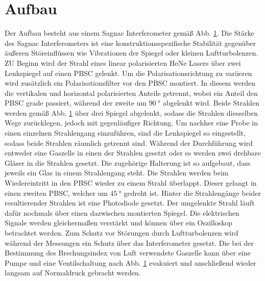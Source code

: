\section{Aufbau}
Der Aufbau besteht aus einem Sagnac Interferometer gemäß Abb. \ref{}. Die Stärke des Sagnac Interferometers ist eine konstruktionsspezifische Stabilität gegenüber äußeren Störeinflüssen wie Vibrationen der Spiegel oder kleinen Luftturbolenzen. ZU Beginn wird der Strahl eines linear polarisierten HeNe Lasers über zwei Lenkspiegel auf einen PBSC gelenkt. Um die Polarisationsrichtung zu variieren wird zusätzlich ein Polarisationsfilter vor den PBSC montiert. In diesem werden die vertikalen und horizontal polarisierten Anteile getrennt, wobei ein Anteil den PBSC grade passiert, während der zweite um $\SI{90}{\degree}$ abgelenkt wird. Beide Strahlen werden gemäß Abb. \ref{} über drei Spiegel abgelenkt, sodass die Strahlen diesselben Wege zurücklegen, jedoch mit gegenläufiger Richtung. Um nachher eine Probe in einen einzelnen Strahlengang einzuführen, sind die Lenkspiegel so eingestellt, sodass beide Strahlen räumlich getrennt sind. Während der Durchführung wird entweder eine Gaszelle in einen der Strahlen gesetzt oder es werden zwei drehbare Gläser in die Strahlen gesetzt. Die zugehörige Halterung ist so aufgebaut, dass jeweils ein Glas in einem Strahlengang steht. Die Strahlen werden beim Wiedereintritt in den PBSC wieder zu einem Strahl überlappt. Dieser gelangt in einen zweiten PBSC, welcher um $\SI{45}{\degree}$ gedreht ist. Hinter die Strahlengänge beider resultierender Strahlen ist eine Photodiode gesetzt. Der umgelenkte Strahl läuft dafür nochmals über einen dazwischen montierten Spiegel. Die elektrischen Signale werden gleichermaßen verstärkt und können über ein Oszilloskop betrachtet werden. Zum Schutz vor Störungen durch Luftturbolenzen wird während der Messungen ein Schutz über das Interferometer gesetzt. Die bei der Bestimmung des Brechungsindex von Luft verwendete Gaszelle kann über eine Pumpe und eine Ventilschaltung nach Abb. \ref{} evakuiert und anschließend wieder langsam auf Normaldruck gebracht werden.
